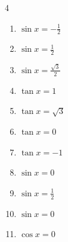 \begin{multicols}{4}
\begin{enumerate}

\columnbreak %

  \item $\displaystyle \sin{x}  = -\frac{1}{2}$


  \item $\displaystyle \sin{x}  = \frac{1}{2}$


  \item $\displaystyle \sin{x}  = \frac{\sqrt{3}}{2}$


  \item $\displaystyle \tan{x}  = 1$


  \item $\displaystyle \tan{x}  = \sqrt{3}$


  \item $\displaystyle \tan{x}  = 0$

        \phantom{$\displaystyle x = 0 , \pi$}

  \item $\displaystyle \tan{x}  = -1$


  \item $\displaystyle \sin{x}  = 0$

        \phantom{$\displaystyle x = 0 , \pi$}

  \item $\displaystyle \sin{x}  = \frac{1}{2}$


  \item $\displaystyle \sin{x}  = 0$

        \phantom{$\displaystyle x = 0 , \pi$}

  \item $\displaystyle \cos{x}  = 0$



\end{enumerate}
\end{multicols}
